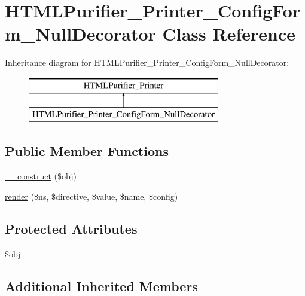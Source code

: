 \hypertarget{classHTMLPurifier__Printer__ConfigForm__NullDecorator}{\section{H\+T\+M\+L\+Purifier\+\_\+\+Printer\+\_\+\+Config\+Form\+\_\+\+Null\+Decorator Class Reference}
\label{classHTMLPurifier__Printer__ConfigForm__NullDecorator}
}
Inheritance diagram for H\+T\+M\+L\+Purifier\+\_\+\+Printer\+\_\+\+Config\+Form\+\_\+\+Null\+Decorator\+:\begin{figure}[H]
\begin{center}
\leavevmode
\includegraphics[height=2.000000cm]{classHTMLPurifier__Printer__ConfigForm__NullDecorator}
\end{center}
\end{figure}
\subsection*{Public Member Functions}
\begin{DoxyCompactItemize}
\item 
\hyperlink{classHTMLPurifier__Printer__ConfigForm__NullDecorator_a7188202fd00c93704712b871c3fba905}{\+\_\+\+\_\+construct} (\$obj)
\item 
\hyperlink{classHTMLPurifier__Printer__ConfigForm__NullDecorator_a97ba6a2ed7a44f78b24d9f1756328097}{render} (\$ns, \$directive, \$value, \$name, \$config)
\end{DoxyCompactItemize}
\subsection*{Protected Attributes}
\begin{DoxyCompactItemize}
\item 
\hyperlink{classHTMLPurifier__Printer__ConfigForm__NullDecorator_a7e9757e34fd37ec59f3f1042c07422ba}{\$obj}
\end{DoxyCompactItemize}
\subsection*{Additional Inherited Members}



